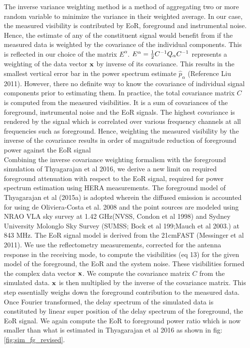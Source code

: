 \documentclass[twocolumn]{emulateapj}
\begin{document}
The inverse variance weighting method is a method of aggregating two or more
random variable to minimize the variance in their weighted average. In our
case, the measured visibility is contributed by EoR, foreground and
instrumental noise. Hence, the estimate of any of the constituent signal would
benefit from if the measured data is weighted by the covariance of the
individual components. This is reflected in our choice of the matrix
$E^{\alpha}$.  $E^{\alpha} = {1 \over 2} C^{-1} Q_{\alpha} C^{-1}$ represents a
weighting of the data vector $\bold x$ by inverse of its covariance. This
results in the smallest vertical error bar in the power spectrum estimate $\hat
p_{\alpha}$ (Reference Liu 2011).  However, there no definite way to know the
covariance of individual signal components prior to estimating them. In
practice, the total covariance matrix $C$ is computed from the measured
visibilities. It is a sum of covariances of the foreground, instrumental noise
and the EoR signals. The highest covariance is rendered by the signal which is
correlated over various frequency channels at all frequencies such as
foreground. Hence, weighting the measured visibility by the inverse of the
covariance results in order of magnitude reduction of foreground power against
the EoR signal \\ Combining the inverse covariance weighting formalism with the
foreground simulation of Thyagarajan et al 2016, we derive a new limit on
required foreground attenuation with respect to the EoR signal, required for
power spectrum estimation using HERA measurements. The foreground model of
Thyagarajan et al (2015a) is adopted wherein the diffused emission is accounted
for using de Oliviera-Costa et al. 2008 and the point sources are modeled using
NRAO VLA sky survey at 1.42 GHz(NVSS, Condon et al 1998) and Sydney University
Molonglo Sky Survey (SUMSS; Bock et al 199;Mauch et al 2003.) at 843 MHz. The
EoR signal model is derived from the 21cmFAST (Messinger et al 2011). We use
the reflectometry measurements, corrected for the antenna response in the
receiving mode, to compute the visibilities (eq 13) for the given model of the
foreground, the EoR and the system noise. These visibilities formed the complex
data vector $\bold x$. We compute the covariance matrix $C$ from the simulated
data. $\bold x$ is then multiplied by the inverse of the covariance matrix.
This step essentially weighs down the foreground contribution to the measured
data. Once Fourier transformed, the delay spectrum of the simulated data is
constituted by linear super position of the delay spectrum of the foreground,
the EoR signal.  We again compute the EoR to foreground power ratio which is
now smaller than what is estimated in Thyagarajan et al 2016 as shown in
fig:\ref{fig:sim_fg_revised}. 
\end{document}
